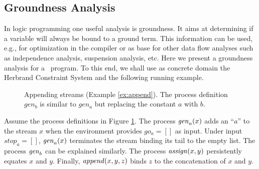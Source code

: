 \documentclass{tlp}
\begin{document}
\subsection{Groundness Analysis}\label{sec:ground}
In logic programming one useful  analysis is groundness. It aims at determining if a variable will always be bound to a ground term. This information can be used, e.g., for optimization in the compiler
 or as base for other data flow analyses such as independence analysis, suspension analysis, etc. Here we present a  groundness analysis for a \tccp\ program. To this end, we shall use as concrete domain the Herbrand Constraint System and the following running example. 
   \begin{figure}
\caption{Appending streams (Example \ref{ex:append}). The process definition $gen_b$ is similar to  $gen_a$ but replacing the constant $a$ with $b$. \label{fig-ex-append}}
\end{figure}
 \begin{example}[Append]\label{ex:append}
Assume the process definitions  in Figure \ref{fig-ex-append}.  The process ${\it gen}_a(x)$ adds an ``$a$'' to the stream  $x$  when the environment provides $go_a=[]$ as input. Under input $stop_a=[]$, ${\it gen}_a(x)$ terminates the stream binding its tail to the empty list. The process  ${\it gen}_b$ can be explained similarly.  The process ${\it assign}(x,y)$ 
persistently equates $x$ and $y$. Finally,  ${\it append}(x,y,z)$ binds $z$ to the concatenation of $x$ and $y$. 
\end{example}
\end{document}
